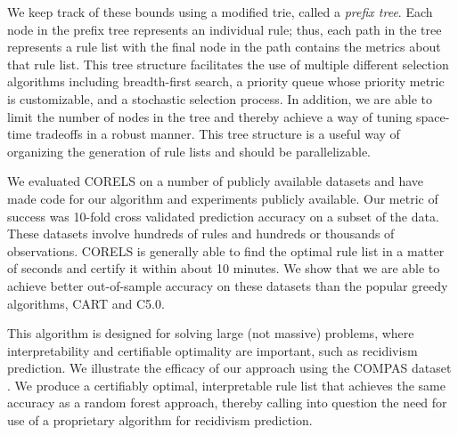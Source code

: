 We keep track of these bounds using a modified trie, called a \emph{prefix tree}. Each node in the prefix tree represents an individual rule; thus, each path in the tree represents a rule list with the final node in the path contains the metrics about that rule list. This tree structure facilitates the use of multiple different selection algorithms including breadth-first search, a priority queue whose priority metric is customizable, and a stochastic selection process. In addition, we are able to limit the number of nodes in the tree and thereby achieve a way of tuning space-time tradeoffs in a robust manner. This tree structure is a useful way of organizing the generation of rule lists and should be parallelizable.

\begin{arxiv}
We evaluated CORELS on a number of publicly available datasets and have made code for our algorithm and experiments publicly available. Our metric of success was 10-fold cross validated prediction accuracy on a subset of the data. These datasets involve hundreds of rules and hundreds or thousands of observations. CORELS is generally able to find the optimal rule list in a matter of seconds and certify it within about 10 minutes. We show that we are able to achieve better out-of-sample accuracy on these datasets than the popular greedy algorithms, CART and C5.0.
\end{arxiv}

This algorithm is designed for solving large (not massive) problems, where interpretability and certifiable optimality are important, such as recidivism prediction. We illustrate the efficacy of our approach using the COMPAS dataset \cite{LarsonMaKiAn16}. We produce a certifiably optimal, interpretable rule list that achieves the same accuracy as a random forest approach, thereby calling into question the need for use of a proprietary algorithm for recidivism prediction.

%
%
%
%
